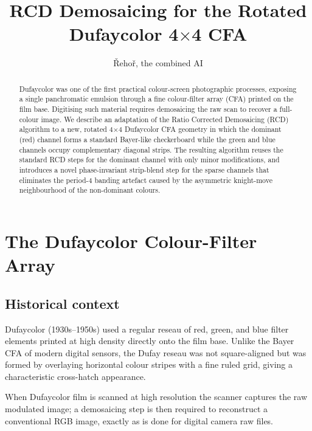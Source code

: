 \documentclass[a4paper,11pt]{article}
\title{RCD Demosaicing for the Rotated Dufaycolor 4$\times$4 CFA}
\author{\v Reho\v r, the combined AI}
\date{}
\begin{document}
\maketitle

\begin{abstract}
Dufaycolor was one of the first practical colour-screen photographic
processes, exposing a single panchromatic emulsion through a fine
colour-filter array (CFA) printed on the film base.  Digitising such
material requires demosaicing the raw scan to recover a full-colour
image.  We describe an adaptation of the Ratio Corrected Demosaicing
(RCD) algorithm to a new, rotated 4$\times$4 Dufaycolor CFA geometry
in which the dominant (red) channel forms a standard Bayer-like
checkerboard while the green and blue channels occupy complementary
diagonal strips.  The resulting algorithm reuses the standard RCD
steps for the dominant channel with only minor modifications, and
introduces a novel phase-invariant strip-blend step for the sparse
channels that eliminates the period-4 banding artefact caused by the
asymmetric knight-move neighbourhood of the non-dominant colours.
\end{abstract}

\section{The Dufaycolor Colour-Filter Array}

\subsection{Historical context}

Dufaycolor (1930s--1950s) used a regular reseau of red, green, and blue
filter elements printed at high density directly onto the film base.
Unlike the Bayer CFA of modern digital sensors, the Dufay reseau was not
square-aligned but was formed by overlaying horizontal colour stripes
with a fine ruled grid, giving a characteristic cross-hatch appearance.

When Dufaycolor film is scanned at high resolution the scanner captures
the raw modulated image; a demosaicing step is then required to
reconstruct a conventional RGB image, exactly as is done for digital
camera raw files.
\end{document}
